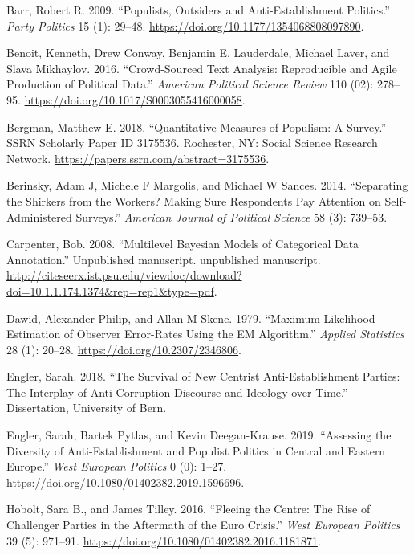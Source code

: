 \documentclass[12pt,]{article}
\begin{document}
\leavevmode\hypertarget{ref-barr_populists_2009}{}%
Barr, Robert R. 2009. ``Populists, Outsiders and Anti-Establishment
Politics.'' \emph{Party Politics} 15 (1): 29--48.
\url{https://doi.org/10.1177/1354068808097890}.

\leavevmode\hypertarget{ref-benoit_crowd-sourced_2016}{}%
Benoit, Kenneth, Drew Conway, Benjamin E. Lauderdale, Michael Laver, and
Slava Mikhaylov. 2016. ``Crowd-Sourced Text Analysis: Reproducible and
Agile Production of Political Data.'' \emph{American Political Science
Review} 110 (02): 278--95.
\url{https://doi.org/10.1017/S0003055416000058}.

\leavevmode\hypertarget{ref-bergman_quantitative_2018}{}%
Bergman, Matthew E. 2018. ``Quantitative Measures of Populism: A
Survey.'' SSRN Scholarly Paper ID 3175536. Rochester, NY: Social Science
Research Network. \url{https://papers.ssrn.com/abstract=3175536}.

\leavevmode\hypertarget{ref-berinsky_separating_2014}{}%
Berinsky, Adam J, Michele F Margolis, and Michael W Sances. 2014.
``Separating the Shirkers from the Workers? Making Sure Respondents Pay
Attention on Self-Administered Surveys.'' \emph{American Journal of
Political Science} 58 (3): 739--53.

\leavevmode\hypertarget{ref-carpenter_multilevel_2008}{}%
Carpenter, Bob. 2008. ``Multilevel Bayesian Models of Categorical Data
Annotation.'' Unpublished manuscript. unpublished manuscript.
\url{http://citeseerx.ist.psu.edu/viewdoc/download?doi=10.1.1.174.1374\&rep=rep1\&type=pdf}.

\leavevmode\hypertarget{ref-dawid_maximum_1979}{}%
Dawid, Alexander Philip, and Allan M Skene. 1979. ``Maximum Likelihood
Estimation of Observer Error-Rates Using the EM Algorithm.''
\emph{Applied Statistics} 28 (1): 20--28.
\url{https://doi.org/10.2307/2346806}.

\leavevmode\hypertarget{ref-engler_survival_2018}{}%
Engler, Sarah. 2018. ``The Survival of New Centrist Anti-Establishment
Parties: The Interplay of Anti-Corruption Discourse and Ideology over
Time.'' Dissertation, University of Bern.

\leavevmode\hypertarget{ref-engler_assessing_2019}{}%
Engler, Sarah, Bartek Pytlas, and Kevin Deegan-Krause. 2019. ``Assessing
the Diversity of Anti-Establishment and Populist Politics in Central and
Eastern Europe.'' \emph{West European Politics} 0 (0): 1--27.
\url{https://doi.org/10.1080/01402382.2019.1596696}.

\leavevmode\hypertarget{ref-hobolt_fleeing_2016}{}%
Hobolt, Sara B., and James Tilley. 2016. ``Fleeing the Centre: The Rise
of Challenger Parties in the Aftermath of the Euro Crisis.'' \emph{West
European Politics} 39 (5): 971--91.
\url{https://doi.org/10.1080/01402382.2016.1181871}.
\end{document}
